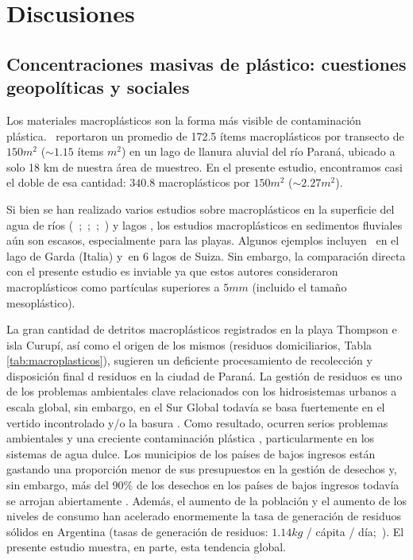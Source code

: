 \section{Discusiones}
\label{sec:discusiones}

\subsection{Concentraciones masivas de plástico: cuestiones geopolíticas y sociales}%
Los materiales macroplásticos son la forma más visible de contaminación plástica.~\cite{Blettler2017} reportaron un promedio de 172.5 ítems macroplásticos por transecto de $150 m^{2}$ ($\sim 1.15$ ítems $m^{2}$) en un lago de llanura aluvial del río Paraná, ubicado a solo 18 km de nuestra área de muestreo. En el presente estudio, encontramos casi el doble de esa cantidad: $340.8$ macroplásticos por $150 m^{2}$ ($\sim 2.27 m^{2}$).

Si bien se han realizado varios estudios sobre macroplásticos en la superficie del agua de ríos (~\cite{GASPERI2014163};~\cite{faure2015};~\cite{Baldwin2016};~\cite{LAHENS2018661}) y lagos \parencite{faure2015}, los estudios macroplásticos en sedimentos fluviales aún son escasos, especialmente para las playas. Algunos ejemplos incluyen~\cite{imhof2013contamination} en el lago de Garda (Italia) y~\cite{faure2015}en 6 lagos de Suiza. Sin embargo, la comparación directa con el presente estudio es inviable ya que estos autores consideraron macroplásticos como partículas superiores a $5 mm$ (incluido el tamaño mesoplástico).

La gran cantidad de detritos macroplásticos registrados en la playa Thompson e isla Curupí, así como el origen de los mismos (residuos domiciliarios, Tabla \ref{tab:macroplasticos}), sugieren un deficiente procesamiento de recolección y disposición final d residuos en la ciudad de Paraná. La gestión de residuos es uno de los problemas ambientales clave relacionados con los hidrosistemas urbanos a escala global, sin embargo, en el Sur Global todavía se basa fuertemente en el vertido incontrolado y/o la basura \parencite{GUERRERO2013220}. Como resultado, ocurren serios problemas ambientales \parencite{ALKHATIB20101131} y una creciente contaminación plástica \parencite{Battulga2019}, particularmente en los sistemas de agua dulce. Los municipios de los países de bajos ingresos están gastando una proporción menor de sus presupuestos en la gestión de desechos y, sin embargo, más del $90\%$  de los desechos en los países de bajos ingresos todavía se arrojan abiertamente \parencite{Kaza2018}. Además, el aumento de la población y el aumento de los niveles de consumo han acelerado enormemente la tasa de generación de residuos sólidos en Argentina (tasas de generación de residuos: $1.14 kg$ / cápita / día;~\cite{Kaza2018}). El presente estudio muestra, en parte, esta tendencia global.

